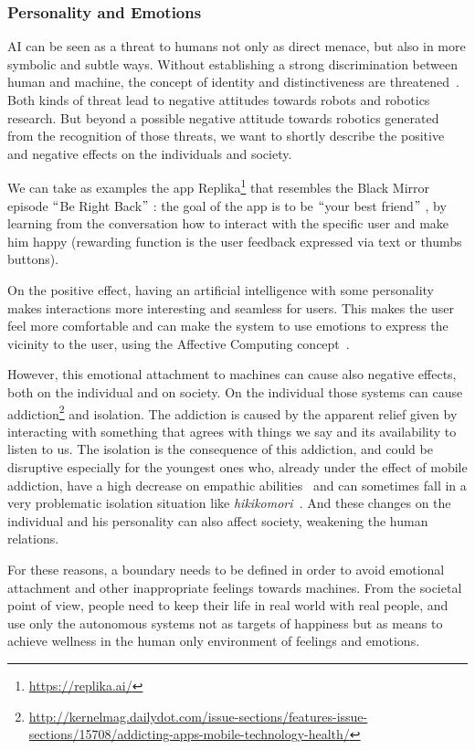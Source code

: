 \subsubsection{Personality and Emotions}
AI can be seen as a threat to humans not only as direct menace, but also in more symbolic and subtle ways. Without establishing a strong discrimination between human and machine, the concept of identity and distinctiveness are threatened~\cite{zlotowski2017can}. Both kinds of threat lead to negative attitudes towards robots and robotics research. But beyond a possible negative attitude towards robotics generated from the recognition of those threats, we want to shortly describe the positive and negative effects on the individuals and society.

We can take as examples the app Replika\footnote{\url{https://replika.ai/}} that resembles the Black Mirror episode $``$Be Right Back$"$ : the goal of the app is to be $``$your best friend$"$ , by learning from the conversation how to interact with the specific user and make him happy (rewarding function is the user feedback expressed via text or thumbs buttons).

On the positive effect, having an artificial intelligence with some personality makes interactions more interesting and seamless for users. This makes the user feel more comfortable and can make the system to use emotions to express the vicinity to the user, using the Affective Computing concept~\cite{picard2000affective}.

However, this emotional attachment to machines can cause also negative effects, both on the individual and on society. On the individual those systems can cause addiction\footnote{\url{http://kernelmag.dailydot.com/issue-sections/features-issue-sections/15708/addicting-apps-mobile-technology-health/}} and isolation. The addiction is caused by the apparent relief given by interacting with something that agrees with things we say and its availability to listen to us. The isolation is the consequence of this addiction, and could be disruptive especially for the youngest ones who, already under the effect of mobile addiction, have a high decrease on empathic abilities~\cite{konrath2011changes} and can sometimes fall in a very problematic isolation situation like \textit{hikikomori~\cite{furlong2008japanese}}. And these changes on the individual and his personality can also affect society, weakening the human relations.

For these reasons, a boundary needs to be defined in order to avoid emotional attachment and other inappropriate feelings towards machines. From the societal point of view, people need to keep their life in real world with real people, and use only the autonomous systems not as targets of happiness but as means to achieve wellness in the human only environment of feelings and emotions.

